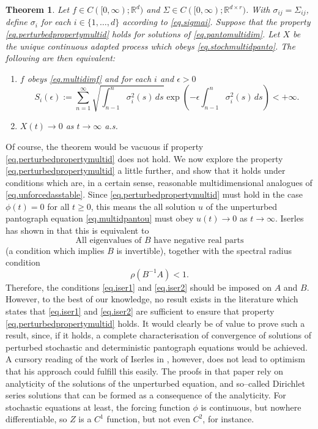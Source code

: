 \documentclass[a4paper,10pt,reqno]{amsart}
\numberwithin{equation}{section}
\newtheorem{theorem}{Theorem}
\theoremstyle{definition}
\theoremstyle{remark}
\DeclareMathOperator{\1}{\mathbbm 1}
\begin{document}
\begin{theorem} \label{thm.multi1}
Let $f\in C([0,\infty);\mathbb{R}^d)$ and $\Sigma\in C([0,\infty);\mathbb{R}^{d\times r})$. With $\sigma_{ij}=\Sigma_{ij}$,  define $\sigma_i$ for each $i\in \{1,\ldots,d\}$ according to \eqref{eq.sigmai}. 
Suppose that the property \eqref{eq.perturbedpropertymultid} holds for solutions of \eqref{eq.pantomultidim}. 
Let $X$ be the unique continuous adapted process which obeys \eqref{eq.stochmultidpanto}.
The following are then equivalent:
\begin{enumerate}
	\item[(A)] $f$ obeys \eqref{eq.multidimf} and for each $i$ and $\epsilon>0$ 	\begin{equation} \label{eq.Si}
		S_i(\epsilon):= \sum_{n=1}^\infty \sqrt{\int_{n-1}^n\sigma_i^2(s)\,ds} \exp\left(-\epsilon\int_{n-1}^{n}\sigma_i^2(s)\,ds\right)<+\infty.
	\end{equation}
	\item[(B)] $X(t)\to 0$ as $t\to\infty$ a.s.
\end{enumerate}
\end{theorem} 
Of course, the theorem would be vacuous if property \eqref{eq.perturbedpropertymultid} does not hold. We now explore the property \eqref{eq.perturbedpropertymultid} a little further, and show that it holds under conditions which are, in a certain sense, reasonable multidimensional analogues of \eqref{eq.unforcedasstable}. Since \eqref{eq.perturbedpropertymultid} must hold in the case $\phi(t)=0$ for all $t\geq 0$, this means the all solution $u$ of the unperturbed pantograph equation 
\eqref{eq.multidpantou} must obey $u(t)\to 0$ as $t\to\infty$. Iserles has shown in \cite{Iser} that this is equivalent to 
\begin{equation} \label{eq.iser1}
\text{All eigenvalues of $B$ have negative real parts}
\end{equation}
(a condition which implies $B$ is invertible), together with the spectral radius condition 
\begin{equation} \label{eq.iser2}
\rho(B^{-1}A)<1.
\end{equation}
Therefore, the conditions \eqref{eq.iser1} and \eqref{eq.iser2} should be imposed on $A$ and $B$. However, to the best of our knowledge, no result exists in the literature which states that \eqref{eq.iser1} and \eqref{eq.iser2} are sufficient to ensure that property \eqref{eq.perturbedpropertymultid} holds. It would clearly be of value to prove such a result, since, if it holds, a complete characterisation of convergence of solutions of  perturbed stochastic and deterministic pantograph equations would be achieved. A cursory reading of the work of Iserles in \cite{Iser}, however, does not lead to optimism that his approach could fulfill this easily. The proofs in that paper rely on analyticity of the solutions of the unperturbed equation, and so--called Dirichlet series solutions that can be formed as a consequence of the analyticity. For stochastic equations at least, the forcing function $\phi$ is continuous, but nowhere differentiable, so $Z$ is a $C^1$ function, but not even $C^2$, for instance.     
\end{document}
